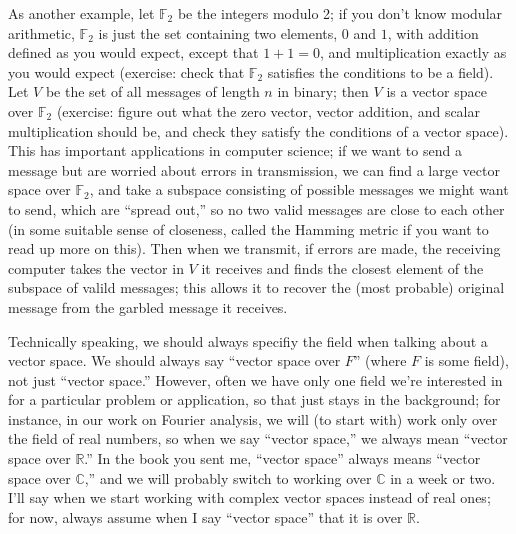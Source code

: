 \documentclass{article}
\begin{document}
As another example, let $\mathbb{F}_2$ be the integers modulo 2; if you don't know modular arithmetic, $\mathbb{F}_2$ is just the set containing two elements, $0$ and $1$, with addition defined as you would expect, except that $1+1=0$, and multiplication exactly as you would expect (exercise: check that $\mathbb{F}_2$ satisfies the conditions to be a field). Let $V$ be the set of all messages of length $n$ in binary; then $V$ is a vector space over $\mathbb{F}_2$ (exercise: figure out what the zero vector, vector addition, and scalar multiplication should be, and check they satisfy the conditions of a vector space). This has important applications in computer science; if we want to send a message but are worried about errors in transmission, we can find a large vector space over $\mathbb{F}_2$, and take a subspace consisting of possible messages we might want to send, which are ``spread out,'' so no two valid messages are close to each other (in some suitable sense of closeness, called the Hamming metric if you want to read up more on this). Then when we transmit, if errors are made, the receiving computer takes the vector in $V$ it receives and finds the closest element of the subspace of valild messages; this allows it to recover the (most probable) original message from the garbled message it receives.
\bigskip


Technically speaking, we should always specifiy the field when talking about a vector space. We should always say ``vector space over $F$'' (where $F$ is some field), not just ``vector space.'' However, often we have only one field we're interested in for a particular problem or application, so that just stays in the background; for instance, in our work on Fourier analysis, we will (to start with) work only over the field of real numbers, so when we say ``vector space,'' we always mean ``vector space over $\mathbb{R}$.'' In the book you sent me, ``vector space'' always means ``vector space over $\mathbb{C}$,'' and we will probably switch to working over $\mathbb{C}$ in a week or two. I'll say when we start working with complex vector spaces instead of real ones; for now, always assume when I say ``vector space'' that it is over $\mathbb{R}$.
\end{document}

